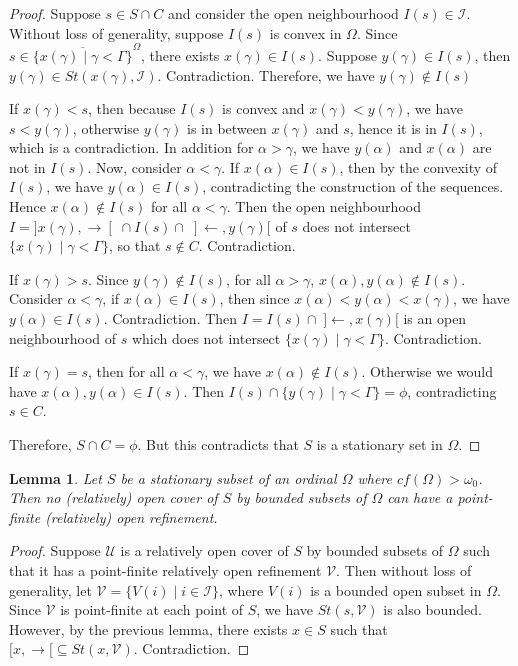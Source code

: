 \documentclass[12pt,oneside,english]{amsbook}
\numberwithin{equation}{section} %
\numberwithin{figure}{section} %
\theoremstyle{plain}
\numberwithin{section}{chapter}
\theoremstyle{plain}
\newtheorem{lem}[thm]{Lemma}
\begin{document}
\begin{proof}
  Suppose $s \in S \cap C$ and consider the open neighbourhood $I(s) \in \mathcal{I}$.%
  Without loss of generality, suppose $I(s)$ is convex in $\Omega$. Since $s \in \overline{\{x(\gamma) \; | \; \gamma < \Gamma \}}^{\Omega}$, there exists $x(\gamma) \in I(s)$. Suppose $y(\gamma) \in I(s)$, then $y(\gamma) \in St(x(\gamma), \mathcal{I})$. Contradiction. Therefore, we have $y(\gamma) \notin I(s)$

  If $x(\gamma) < s$, then because $I(s)$ is convex and $x(\gamma) < y(\gamma)$, we have $s < y(\gamma)$, otherwise $y(\gamma)$ is in between $x(\gamma)$ and $s$, hence it is in $I(s)$, which is a contradiction. In addition for $\alpha > \gamma$, we have $y(\alpha)$ and $x(\alpha)$ are not in $I(s)$. Now, consider $\alpha < \gamma$. If $x(\alpha) \in I(s)$, then by the convexity of $I(s)$, we have $y(\alpha) \in I(s)$, contradicting the construction of the sequences. Hence $x(\alpha) \notin I(s)$ for all $\alpha < \gamma$. Then the open neighbourhood $I = ]x(\gamma), \rightarrow[ \; \cap I(s) \cap \; ]\leftarrow, y(\gamma)[$ of $s$ does not intersect $\{x(\gamma) \; | \; \gamma < \Gamma \}$, so that $s \notin C$. Contradiction.

  If  $x(\gamma) > s$. Since $y(\gamma) \notin I(s)$, for all $ \alpha > \gamma$, $x(\alpha),y(\alpha) \notin I(s)$. Consider $\alpha < \gamma$, if $x(\alpha) \in I(s)$, then since $x(\alpha) < y(\alpha) < x(\gamma)$, we have $y(\alpha) \in I(s)$. Contradiction. Then $I = I(s) \cap \; ]\leftarrow, x(\gamma)[$ is an open neighbourhood of $s$ which does not intersect $\{x(\gamma) \; | \; \gamma < \Gamma \}$. Contradiction.

  If $x(\gamma) = s$, then for all $\alpha < \gamma$, we have $x(\alpha) \notin I(s)$. Otherwise we would have $x(\alpha), y(\alpha) \in I(s)$. Then $I(s) \cap \{y(\gamma) \; | \; \gamma < \Gamma \} = \phi$, contradicting $s \in C$.

  Therefore, $S \cap C = \phi$. But this contradicts that $S$ is a stationary set in $\Omega$.
\end{proof}

\begin{lem} \label{lem:paracompact:stationary:3}
  Let $S$ be a stationary subset of an ordinal $\Omega$ where $cf(\Omega) > \omega_{0}$. Then no (relatively) open cover of $S$ by bounded subsets of $\Omega$ can have a point-finite (relatively) open refinement.
\end{lem}

\begin{proof}
  Suppose $\mathcal{U}$ is a relatively open cover of $S$ by bounded subsets of $\Omega$ such that it has a point-finite relatively open refinement $\mathcal{V}$. Then without loss of generality, let $\mathcal{V} = \{V(i) \; | \; i \in \mathcal{I}\}$, where $V(i)$ is a bounded open subset in $\Omega$. Since $\mathcal{V}$ is point-finite at each point of $S$, we have $St(s,\mathcal{V})$ is also bounded. However, by the previous lemma, there exists $x \in S$ such that $[x,\rightarrow[ \subseteq St(x,\mathcal{V})$. Contradiction.
\end{proof}
\end{document}
